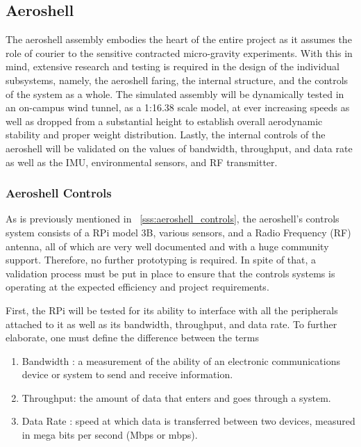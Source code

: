 
\subsection{Aeroshell}

\indent\indent The aeroshell assembly embodies the heart of the entire project as it assumes the role of courier to the sensitive contracted micro-gravity experiments. With this in mind, extensive research and testing is required in the design of the individual subsystems, namely, the aeroshell faring, the internal structure, and the controls of the system as a whole. The simulated assembly will be dynamically tested in an on-campus wind tunnel, as a 1:16.38 scale model, at ever increasing speeds as well as dropped from a substantial height to establish overall aerodynamic stability and proper weight distribution. Lastly, the internal controls of the aeroshell will be validated on the values of bandwidth, throughput, and data rate as well as the IMU, environmental sensors, and RF transmitter. 




\subsubsection{\label{sss:aeroshell_controls_validation}Aeroshell Controls}

\indent\indent As is previously mentioned in ~\ref{sss:aeroshell_controls}, the aeroshell's controls system consists of a RPi model 3B, various sensors, and a Radio Frequency (RF) antenna, all of which are very well documented and with a huge community support. Therefore, no further prototyping is required. In spite of that, a validation process must be put in place to ensure that the controls systems is operating at the expected efficiency and project requirements.

First, the RPi will be tested for its ability to interface with all the peripherals attached to it as well as its bandwidth, throughput, and data rate. To further elaborate, one must define the difference between the terms %

\begin{enumerate}
    \item Bandwidth : a measurement of the ability of an electronic communications device or system to send and receive information.
    \item Throughput: the amount of data that enters and goes through a system.
    \item Data Rate : speed at which data is transferred between two devices, measured in mega bits per second (Mbps or mbps).
\end{enumerate}

